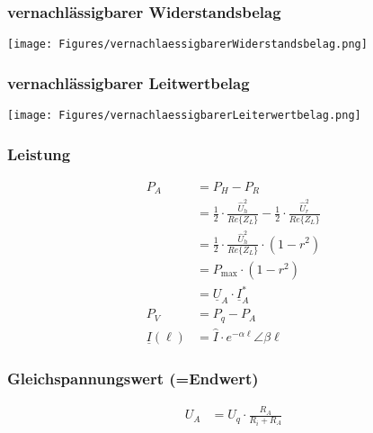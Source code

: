 \subsubsection{vernachlässigbarer Widerstandsbelag}
\texttt{[image: Figures/vernachlaessigbarerWiderstandsbelag.png]}

\subsubsection{vernachlässigbarer Leitwertbelag}
\texttt{[image: Figures/vernachlaessigbarerLeiterwertbelag.png]}


\subsubsection{Leistung}
\begin{align*}
    P_{A}            & = P_{H}-P_{R}                                                                                                 \\
                     & = \frac{1}{2} \cdot \frac{\hat{U}_{h}^{2}}{Re\{Z_{L}\}}-\frac{1}{2} \cdot \frac{\hat{U}_{r}^{2}}{Re\{Z_{L}\}} \\
                     & =\frac{1}{2} \cdot \frac{\hat{U}_{h}^{2}}{Re\{Z_{L}\}} \cdot\left(1-r^{2}\right)                              \\
                     & = P_{\max} \cdot\left(1-r^{2}\right)                                                                          \\
                     & = \underline{U}_A\cdot\underline{I}_A^*                                                                       \\
    P_V              & = P_q -P_A                                                                                                    \\
    \underline{I}(\ell) & = \hat{I}\cdot e^{-\alpha \ell}\angle \beta \ell
\end{align*}
\subsubsection{Gleichspannungswert (=Endwert)}
\begin{align*}
    U_A & = U_q\cdot\frac{R_A}{R_i+R_A}
\end{align*}

